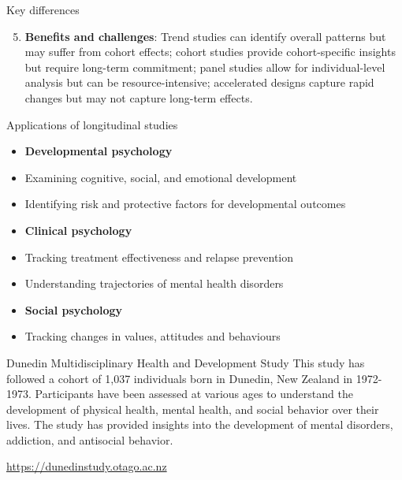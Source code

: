 \documentclass[
  ignorenonframetext,
  aspectratio=169,
]{beamer}
\providecommand{\tightlist}{%
  \setlength{\itemsep}{0pt}\setlength{\parskip}{0pt}}\usepackage{longtable,booktabs,array}
\begin{document}
\begin{frame}{Key differences}
\label{key-differences-2}
\begin{enumerate}
\setcounter{enumi}{4}
\tightlist
\item
  \textbf{Benefits and challenges}: Trend studies can identify overall
  patterns but may suffer from cohort effects; cohort studies provide
  cohort-specific insights but require long-term commitment; panel
  studies allow for individual-level analysis but can be
  resource-intensive; accelerated designs capture rapid changes but may
  not capture long-term effects.
\end{enumerate}
\end{frame}

\begin{frame}{Applications of longitudinal studies}
\label{applications-of-longitudinal-studies}
\begin{itemize}[<+->]
\tightlist
\item
  \textbf{Developmental psychology}
\item
  Examining cognitive, social, and emotional development
\item
  Identifying risk and protective factors for developmental outcomes
\item
  \textbf{Clinical psychology}
\item
  Tracking treatment effectiveness and relapse prevention
\item
  Understanding trajectories of mental health disorders
\item
  \textbf{Social psychology}
\item
  Tracking changes in values, attitudes and behaviours
\end{itemize}
\end{frame}

\begin{frame}{Dunedin Multidisciplinary Health and Development Study}
\label{dunedin-multidisciplinary-health-and-development-study}
This study has followed a cohort of 1,037 individuals born in Dunedin,
New Zealand in 1972-1973. Participants have been assessed at various
ages to understand the development of physical health, mental health,
and social behavior over their lives. The study has provided insights
into the development of mental disorders, addiction, and antisocial
behavior.

\url{https://dunedinstudy.otago.ac.nz}
\end{frame}
\end{document}
